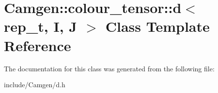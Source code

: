\hypertarget{a00112}{}\section{Camgen\+:\+:colour\+\_\+tensor\+:\+:d$<$ rep\+\_\+t, I, J $>$ Class Template Reference}
\label{a00112}


The documentation for this class was generated from the following file\+:\begin{DoxyCompactItemize}
\item 
include/\+Camgen/d.\+h\end{DoxyCompactItemize}
